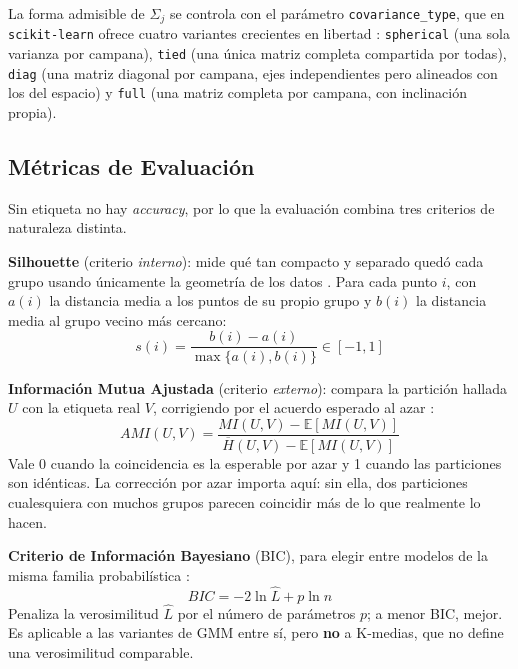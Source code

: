 \documentclass[10pt,journal]{IEEEtran}
\begin{document}
  La forma admisible de $\Sigma_j$ se controla con el par\'ametro \texttt{covariance\_type}, que en \texttt{scikit-learn} ofrece cuatro variantes crecientes en libertad \cite{pedregosa2011}: \texttt{spherical} (una sola varianza por campana), \texttt{tied} (una \'unica matriz completa compartida por todas), \texttt{diag} (una matriz diagonal por campana, ejes independientes pero alineados con los del espacio) y \texttt{full} (una matriz completa por campana, con inclinaci\'on propia).

  \subsection{M\'etricas de Evaluaci\'on}

  Sin etiqueta no hay \emph{accuracy}, por lo que la evaluaci\'on combina tres criterios de naturaleza distinta.

  \textbf{Silhouette} (criterio \emph{interno}): mide qu\'e tan compacto y separado qued\'o cada grupo usando \'unicamente la geometr\'ia de los datos \cite{rousseeuw1987}. Para cada punto $i$, con $a(i)$ la distancia media a los puntos de su propio grupo y $b(i)$ la distancia media al grupo vecino m\'as cercano:
  \begin{equation}
    s(i) = \frac{b(i) - a(i)}{\max\{a(i), b(i)\}} \in [-1, 1]
    \label{eq:silhouette}
  \end{equation}

  \textbf{Informaci\'on Mutua Ajustada} (criterio \emph{externo}): compara la partici\'on hallada $U$ con la etiqueta real $V$, corrigiendo por el acuerdo esperado al azar \cite{vinh2010}:
  \begin{equation}
    AMI(U,V) = \frac{MI(U,V) - \mathbb{E}[MI(U,V)]}{\overline{H}(U,V) - \mathbb{E}[MI(U,V)]}
    \label{eq:ami}
  \end{equation}
  Vale 0 cuando la coincidencia es la esperable por azar y 1 cuando las particiones son id\'enticas. La correcci\'on por azar importa aqu\'i: sin ella, dos particiones cualesquiera con muchos grupos parecen coincidir m\'as de lo que realmente lo hacen.

  \textbf{Criterio de Informaci\'on Bayesiano} (BIC), para elegir entre modelos de la misma familia probabil\'istica \cite{schwarz1978}:
  \begin{equation}
    BIC = -2 \ln \hat{L} + p \ln n
    \label{eq:bic}
  \end{equation}
  Penaliza la verosimilitud $\hat{L}$ por el n\'umero de par\'ametros $p$; a menor BIC, mejor. Es aplicable a las variantes de GMM entre s\'i, pero \textbf{no} a K-medias, que no define una verosimilitud comparable.
\end{document}
